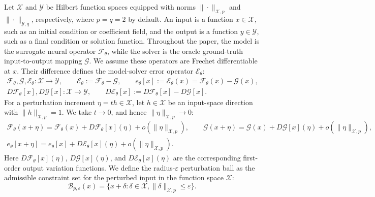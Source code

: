 \documentclass{article}
\begin{document}
Let $\mathcal{X}$ and $\mathcal{Y}$ be Hilbert function spaces equipped with
norms $\|\cdot\|_{\mathcal{X},p}$ and $\|\cdot\|_{\mathcal{Y},q}$, respectively,
where $p=q=2$ by default. An input is a function $x\in\mathcal{X}$, such as an
initial condition or coefficient field, and the output is a function
$y\in\mathcal{Y}$, such as a final condition or solution function. Throughout
the paper, the model is the surrogate neural
operator $\mathcal{F}_\theta$, while the solver is the oracle ground-truth
input-to-output mapping $\mathcal{G}$. We assume these operators are Frechet
differentiable at $x$. Their difference defines the
model-solver error operator $\mathcal{E}_\theta$:
\begin{equation*}
\begin{gathered}
  \mathcal{F}_\theta,\mathcal{G},\mathcal{E}_\theta:\mathcal{X}\to\mathcal{Y},\qquad
  \mathcal{E}_\theta:=\mathcal{F}_\theta-\mathcal{G},\qquad
  e_\theta[x]:=\mathcal{E}_\theta(x)=\mathcal{F}_\theta(x)-\mathcal{G}(x),\\
  D\mathcal{F}_\theta[x],D\mathcal{G}[x]:\mathcal{X}\to\mathcal{Y},\qquad
  D\mathcal{E}_\theta[x]:=D\mathcal{F}_\theta[x]-D\mathcal{G}[x].
\end{gathered}
\end{equation*}
For a perturbation increment $\eta=t h\in\mathcal{X}$, let $h\in\mathcal{X}$ be an
input-space direction with $\|h\|_{\mathcal{X},p}=1$. We take $t\to0$, and hence
$\|\eta\|_{\mathcal{X},p}\to0$:
\begin{equation*}
\begin{gathered}
  \mathcal{F}_\theta(x+\eta)=\mathcal{F}_\theta(x)+D\mathcal{F}_\theta[x](\eta)+o(\|\eta\|_{\mathcal{X},p}),\qquad
  \mathcal{G}(x+\eta)=\mathcal{G}(x)+D\mathcal{G}[x](\eta)+o(\|\eta\|_{\mathcal{X},p}),\\
  e_\theta[x+\eta]=e_\theta[x]+D\mathcal{E}_\theta[x](\eta)+o(\|\eta\|_{\mathcal{X},p}).
\end{gathered}
\end{equation*}
Here $D\mathcal{F}_\theta[x](\eta)$, $D\mathcal{G}[x](\eta)$, and
$D\mathcal{E}_\theta[x](\eta)$ are the corresponding first-order output
variation functions.
We define the radius-$\varepsilon$ perturbation ball as the admissible
constraint set for the perturbed input in the function space $\mathcal{X}$:
\begin{equation*}
  \mathcal{B}_{p,\varepsilon}(x)
  =
  \{x+\delta:\delta\in\mathcal{X},
  \|\delta\|_{\mathcal{X},p}\le\varepsilon\}.
\end{equation*}
\end{document}
